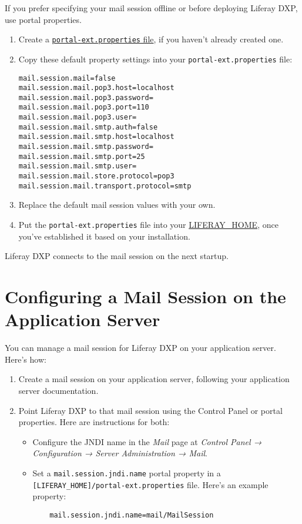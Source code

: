 If you prefer specifying your mail session offline or before deploying
Liferay DXP, use portal properties.

\begin{enumerate}
\def\labelenumi{\arabic{enumi}.}
\item
  Create a
  \href{/docs/7-2/deploy/-/knowledge_base/d/portal-properties}{\texttt{portal-ext.properties}
  file}, if you haven't already created one.
\item
  Copy these default property settings into your
  \texttt{portal-ext.properties} file:

\begin{verbatim}
mail.session.mail=false
mail.session.mail.pop3.host=localhost
mail.session.mail.pop3.password=
mail.session.mail.pop3.port=110
mail.session.mail.pop3.user=
mail.session.mail.smtp.auth=false
mail.session.mail.smtp.host=localhost
mail.session.mail.smtp.password=
mail.session.mail.smtp.port=25
mail.session.mail.smtp.user=
mail.session.mail.store.protocol=pop3
mail.session.mail.transport.protocol=smtp
\end{verbatim}
\item
  Replace the default mail session values with your own.
\item
  Put the \texttt{portal-ext.properties} file into your
  \href{/docs/7-2/deploy/-/knowledge_base/d/liferay-home}{LIFERAY\_HOME},
  once you've established it based on your installation.
\end{enumerate}

Liferay DXP connects to the mail session on the next startup.

\section{Configuring a Mail Session on the Application
Server}\label{configuring-a-mail-session-on-the-application-server}

You can manage a mail session for Liferay DXP on your application
server. Here's how:

\begin{enumerate}
\def\labelenumi{\arabic{enumi}.}
\item
  Create a mail session on your application server, following your
  application server documentation.
\item
  Point Liferay DXP to that mail session using the Control Panel or
  portal properties. Here are instructions for both:

  \begin{itemize}
  \item
    Configure the JNDI name in the \emph{Mail} page at \emph{Control
    Panel → Configuration → Server Administration → Mail}.
  \item
    Set a \texttt{mail.session.jndi.name} portal property in a
    \texttt{{[}LIFERAY\_HOME{]}/portal-ext.properties} file. Here's an
    example property:

\begin{verbatim}
    mail.session.jndi.name=mail/MailSession
\end{verbatim}
  \end{itemize}
\end{enumerate}

